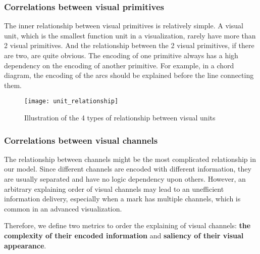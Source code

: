 \subsubsection{Correlations between visual primitives}
The inner relationship between visual primitives is relatively simple.
A visual unit, which is the smallest function unit in a visualization, rarely have more than 2 visual primitives. And the relationship between the 2 visual primitives, if there are two, are quite obvious. The encoding of one primitive always has a high dependency on the encoding of another primitive. For example, in a chord diagram, the encoding of the arcs should be explained before the line connecting them. 


\begin{figure}[tb]
 \centering %
 \texttt{[image: unit\_relationship]}
 \caption{Illustration of the 4 types of relationship between visual units}
 \label{fig:relationship}
\end{figure}

\subsubsection{Correlations between visual channels}
The relationship between channels might be the most complicated relationship in our model. Since different channels are encoded with different information, they are usually separated and have no logic dependency upon others. However, an arbitrary explaining order of visual channels may lead to an unefficient information delivery, especially when a mark has multiple channels, which is common in an advanced visualization. 

Therefore, we define two metrics to order the explaining of visual channels: \textbf{the complexity of their encoded information} and \textbf{saliency of their visual appearance}.


